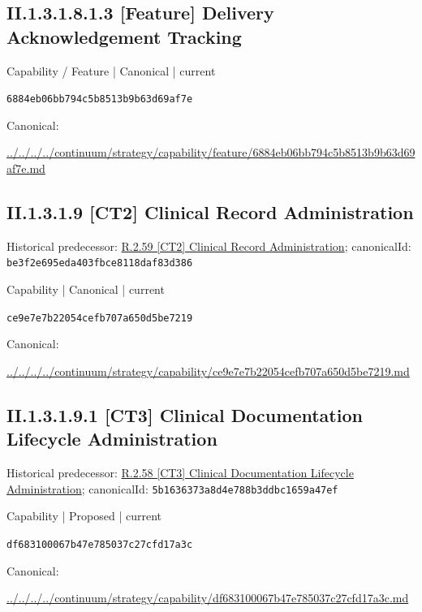 \documentclass[10pt,a4paper]{article}
\begin{document}
\subsection*{II.1.3.1.8.1.3 [Feature] Delivery Acknowledgement Tracking}
\label{element-6884eb06bb794c5b8513b9b63d69af7e}
{\small Capability / Feature | Canonical | current}\par
\texttt{6884eb06bb794c5b8513b9b63d69af7e}\par
Canonical: \par
{\footnotesize\url{../../../../continuum/strategy/capability/feature/6884eb06bb794c5b8513b9b63d69af7e.md}}\par
\subsection*{II.1.3.1.9 [CT2] Clinical Record Administration}
Historical predecessor: \hyperref[element-be3f2e695eda403fbce8118daf83d386]{R.2.59 [CT2] Clinical Record Administration}; canonicalId: \texttt{be3f2e695eda403fbce8118daf83d386}\par
\label{element-ce9e7e7b22054cefb707a650d5be7219}
{\small Capability | Canonical | current}\par
\texttt{ce9e7e7b22054cefb707a650d5be7219}\par
Canonical: \par
{\footnotesize\url{../../../../continuum/strategy/capability/ce9e7e7b22054cefb707a650d5be7219.md}}\par
\subsection*{II.1.3.1.9.1 [CT3] Clinical Documentation Lifecycle Administration}
Historical predecessor: \hyperref[element-5b1636373a8d4e788b3ddbc1659a47ef]{R.2.58 [CT3] Clinical Documentation Lifecycle Administration}; canonicalId: \texttt{5b1636373a8d4e788b3ddbc1659a47ef}\par
\label{element-df683100067b47e785037c27cfd17a3c}
{\small Capability | Proposed | current}\par
\texttt{df683100067b47e785037c27cfd17a3c}\par
Canonical: \par
{\footnotesize\url{../../../../continuum/strategy/capability/df683100067b47e785037c27cfd17a3c.md}}\par
\end{document}
